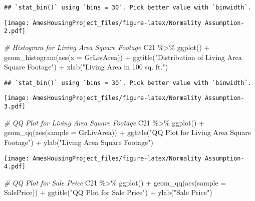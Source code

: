 \documentclass[
]{article}
\newenvironment{Shaded}{\begin{snugshade}}{\end{snugshade}}
\newcommand{\AttributeTok}[1]{\textcolor[rgb]{0.77,0.63,0.00}{#1}}
\newcommand{\CommentTok}[1]{\textcolor[rgb]{0.56,0.35,0.01}{\textit{#1}}}
\newcommand{\FunctionTok}[1]{\textcolor[rgb]{0.00,0.00,0.00}{#1}}
\newcommand{\NormalTok}[1]{#1}
\newcommand{\SpecialCharTok}[1]{\textcolor[rgb]{0.00,0.00,0.00}{#1}}
\newcommand{\StringTok}[1]{\textcolor[rgb]{0.31,0.60,0.02}{#1}}
\begin{document}
\begin{verbatim}
## `stat_bin()` using `bins = 30`. Pick better value with `binwidth`.
\end{verbatim}

\texttt{[image: AmesHousingProject\_files/figure-latex/Normality Assumption-2.pdf]}

\begin{Shaded}
\begin{Highlighting}[]
\CommentTok{\# Histogram for Living Area Square Footage}
\NormalTok{C21 }\SpecialCharTok{\%\textgreater{}\%} \FunctionTok{ggplot}\NormalTok{() }\SpecialCharTok{+} \FunctionTok{geom\_histogram}\NormalTok{(}\FunctionTok{aes}\NormalTok{(}\AttributeTok{x =}\NormalTok{ GrLivArea)) }\SpecialCharTok{+}
  \FunctionTok{ggtitle}\NormalTok{(}\StringTok{"Distribution of Living Area Square Footage"}\NormalTok{) }\SpecialCharTok{+}
  \FunctionTok{xlab}\NormalTok{(}\StringTok{"Living Area in 100 sq. ft."}\NormalTok{)}
\end{Highlighting}
\end{Shaded}

\begin{verbatim}
## `stat_bin()` using `bins = 30`. Pick better value with `binwidth`.
\end{verbatim}

\texttt{[image: AmesHousingProject\_files/figure-latex/Normality Assumption-3.pdf]}

\begin{Shaded}
\begin{Highlighting}[]
\CommentTok{\# QQ Plot for Living Area Square Footage}
\NormalTok{C21 }\SpecialCharTok{\%\textgreater{}\%} \FunctionTok{ggplot}\NormalTok{() }\SpecialCharTok{+} \FunctionTok{geom\_qq}\NormalTok{(}\FunctionTok{aes}\NormalTok{(}\AttributeTok{sample =}\NormalTok{ GrLivArea)) }\SpecialCharTok{+} 
  \FunctionTok{ggtitle}\NormalTok{(}\StringTok{"QQ Plot for Living Area Square Footage"}\NormalTok{) }\SpecialCharTok{+} \FunctionTok{ylab}\NormalTok{(}\StringTok{"Living Area Square Footage"}\NormalTok{)}
\end{Highlighting}
\end{Shaded}

\texttt{[image: AmesHousingProject\_files/figure-latex/Normality Assumption-4.pdf]}

\begin{Shaded}
\begin{Highlighting}[]
\CommentTok{\# QQ Plot for Sale Price}
\NormalTok{C21 }\SpecialCharTok{\%\textgreater{}\%} \FunctionTok{ggplot}\NormalTok{() }\SpecialCharTok{+} \FunctionTok{geom\_qq}\NormalTok{(}\FunctionTok{aes}\NormalTok{(}\AttributeTok{sample =}\NormalTok{ SalePrice)) }\SpecialCharTok{+} 
  \FunctionTok{ggtitle}\NormalTok{(}\StringTok{"QQ Plot for Sale Price"}\NormalTok{) }\SpecialCharTok{+} \FunctionTok{ylab}\NormalTok{(}\StringTok{"Sale Price"}\NormalTok{)}
\end{Highlighting}
\end{Shaded}
\end{document}
